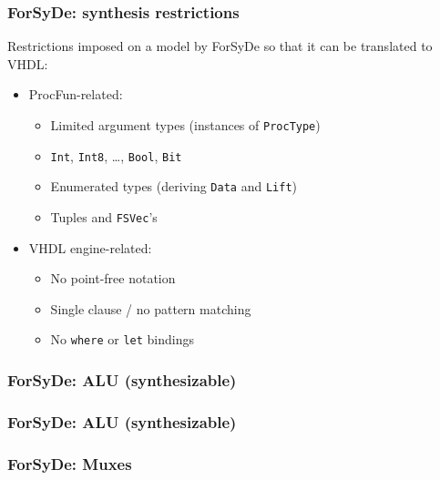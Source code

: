         \begin{frame}
            \frametitle{ForSyDe: synthesis restrictions}
            \par{Restrictions imposed on a model by ForSyDe so that it can be translated to VHDL:}
            \begin{itemize}
                \item ProcFun-related:
                    \begin{itemize}
                        \item Limited argument types (instances of \texttt{ProcType})
                        \item \texttt{Int}, \texttt{Int8}, \ldots, \texttt{Bool}, \texttt{Bit}
                        \item Enumerated types (deriving \texttt{Data} and \texttt{Lift})
                        \item Tuples and \texttt{FSVec}'s
                    \end{itemize}
                \item VHDL engine-related:
                    \begin{itemize}
                        \item No point-free notation
                        \item Single clause / no pattern matching
                        \item No \texttt{where} or \texttt{let} bindings
                    \end{itemize}
            \end{itemize}
        \end{frame}

        \begin{frame}
            \frametitle{ForSyDe: ALU (synthesizable)}
        \end{frame}

        \begin{frame}
            \frametitle{ForSyDe: ALU (synthesizable)}
        \end{frame}


        \begin{frame}
            \frametitle{ForSyDe: Muxes}
        \end{frame}

